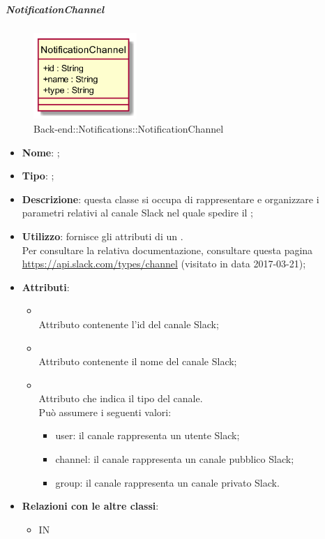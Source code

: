 \hypertarget{NotificationChannel_label}{\subparagraph{NotificationChannel}}
\begin{figure}[h]
	\centering
	\includegraphics[width=0.35\textwidth,height=\textheight,keepaspectratio]{images/ClassNotificationChannel.png}
	\caption{Back-end::Notifications::NotificationChannel}
\end{figure}
\begin{itemize}
	\item \textbf{Nome}: ;
	\item \textbf{Tipo}: ;
	\item \textbf{Descrizione}: questa classe si occupa di rappresentare e organizzare i parametri relativi al canale Slack nel quale spedire il ;
	\item \textbf{Utilizzo}: fornisce gli attributi di un . \\
Per consultare la relativa documentazione, consultare questa pagina \url{https://api.slack.com/types/channel} (visitato in data 2017-03-21);
	\item \textbf{Attributi}:
	\begin{itemize}
		\item[]  \\
		Attributo contenente l'id del canale Slack;
		\item[]  \\
		Attributo contenente il nome del canale Slack;
		\item[]  \\
		Attributo che indica il tipo del canale. \\ Può assumere i seguenti valori:
\begin{itemize}
  \item user: il canale rappresenta un utente Slack;
  \item channel: il canale rappresenta un canale pubblico Slack;
  \item group: il canale rappresenta un canale privato Slack.
\end{itemize}
	\end{itemize}
	\item \textbf{Relazioni con le altre classi}:
	\begin{itemize}
		\item IN \hyperlink{NotificationService_label}{}
	\end{itemize}
\end{itemize}
\FloatBarrier

